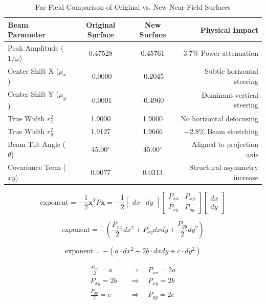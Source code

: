 \documentclass[twoside]{article}
\begin{document}
\section*{}
\begin{table}[h]
\centering
\caption{Far-Field Comparison of Original vs. New Near-Field Surfaces}
\label{tab:surface_comparison}
\begin{tabular}{l c c r}
\hline
\textbf{Beam Parameter} & \textbf{Original Surface} & \textbf{New Surface} & \textbf{Physical Impact} \\
\hline
Peak Amplitude ($1/\omega$) & 0.47528 & 0.45761 & -3.7\% Power attenuation \\
Center Shift X ($\mu_x$) & -0.0000 & -0.2045 & Subtle horizontal steering \\
Center Shift Y ($\mu_y$) & -0.0001 & -0.4960 & Dominant vertical steering \\
True Width $r_x^2$ & 1.9000 & 1.9000 & No horizontal defocusing \\
True Width $r_y^2$ & 1.9127 & 1.9666 & +2.8\% Beam stretching \\
Beam Tilt Angle ($\theta$) & 45.00$^\circ$ & 45.00$^\circ$ & Aligned to projection axis \\
Covariance Term ($xy$) & 0.0077 & 0.0313 & Structural asymmetry increase \\
\hline
\end{tabular}
\end{table}


\[
\text{exponent} = -\frac{1}{2} \mathbf{x}^T P \mathbf{x} = -\frac{1}{2} 
\begin{bmatrix} dx & dy \end{bmatrix} 
\begin{bmatrix} P_{xx} & P_{xy} \\ P_{xy} & P_{yy} \end{bmatrix} 
\begin{bmatrix} dx \\ dy \end{bmatrix}
\]



\[
\text{exponent} = -\left( \frac{P_{xx}}{2}dx^2 + P_{xy}dxdy + \frac{P_{yy}}{2}dy^2 \right)
\]


\[
\text{exponent} = -(a \cdot dx^2 + 2b \cdot dxdy + c \cdot dy^2)
\]


\begin{align*}
\frac{P_{xx}}{2} = a \quad &\Rightarrow \quad P_{xx} = 2a \\
P_{xy} = 2b \quad &\Rightarrow \quad P_{xy} = 2b \\
\frac{P_{yy}}{2} = c \quad &\Rightarrow \quad P_{yy} = 2c
\end{align*}
\end{document}
